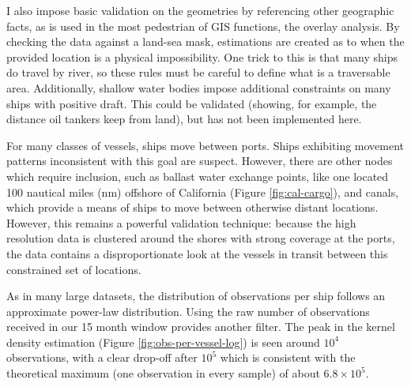 \documentclass[12pt,letterpaper]{article}
\begin{document}
I also impose basic validation on the geometries by referencing other geographic facts, as is used in the most pedestrian of GIS functions, the overlay analysis. By checking the data against a land-sea mask, estimations are created as to when the provided location is a physical impossibility. One trick to this is that many ships do travel by river, so these rules must be careful to define what is a traversable area. Additionally, shallow water bodies impose additional constraints on many ships with positive draft. This could be validated (showing, for example, the distance oil tankers keep from land), but has not been implemented here.

For many classes of vessels, ships move between ports. Ships exhibiting movement patterns inconsistent with this goal are suspect. %
However, there are other nodes which require inclusion, such as ballast water exchange points, like one located 100 nautical miles (nm) offshore of California (Figure \ref{fig:cal-cargo}), and canals, which provide a means of ships to move between otherwise distant locations. However, this remains a powerful validation technique: because the high resolution data is clustered around the shores with strong coverage at the ports, the data contains a disproportionate look at the vessels in transit between this constrained set of locations.

As in many large datasets, the distribution of observations per ship follows an approximate power-law distribution. Using the raw number of observations received in our 15 month window provides another filter. The peak in the kernel density estimation (Figure \ref{fig:obs-per-vessel-log}) is seen around $10^4$ observations, with a clear drop-off after $10^5$ which is consistent with the theoretical maximum (one observation in every sample) of about $6.8 \times 10^5$.
\end{document}
